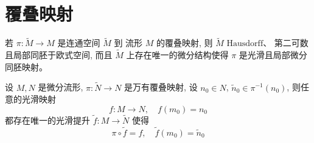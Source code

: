 \section{覆叠映射}

    若 $\pi:\tilde{M}\rightarrow M$ 是连通空间 $\tilde{M}$ 到
    流形 $M$ 的覆叠映射, 则 $\tilde{M}$ $\mathrm{Hausdorff}$、
    第二可数且局部同胚于欧式空间, 而且 $\tilde{M}$ 上存在唯一的微分结构使得 
    $\pi$ 是光滑且局部微分同胚映射。

    设 $M, N$ 是微分流形, $\pi:\tilde{N}\rightarrow N$ 是万有覆叠映射, 
    设 $n_0\in N$, $\tilde{n}_0\in\pi^{-1}(n_0)$, 
    则任意的光滑映射 
    \begin{equation*}
        f:M\rightarrow N, \quad f(m_0) = n_0
    \end{equation*}
    都存在唯一的光滑提升
    $\tilde{f}:M\rightarrow\tilde{N}$ 使得
    \begin{equation*}
        \pi\circ\tilde{f} = f, \quad \tilde{f}(m_0) = \tilde{n}_0
    \end{equation*}

